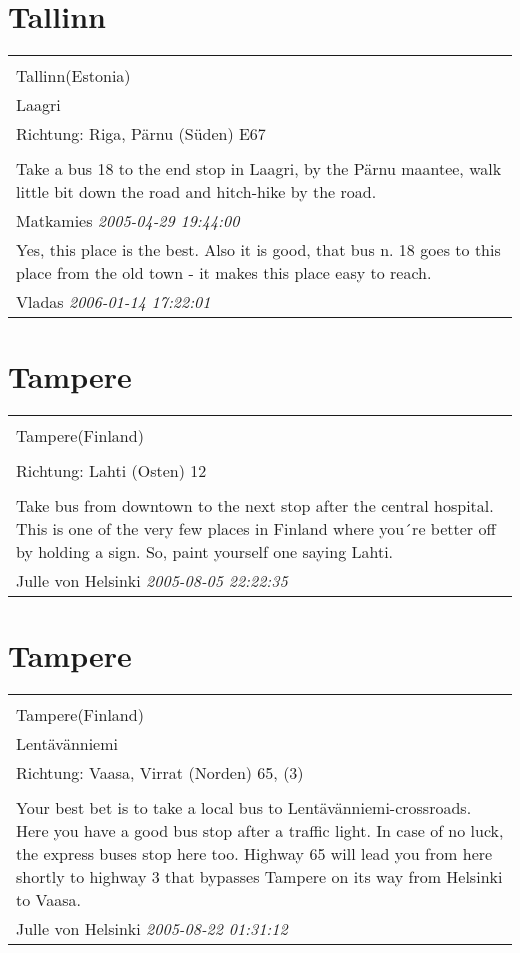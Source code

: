 \documentclass[a4paper,12pt]{article}
\begin{document}
\section{Tallinn}
\begin{tabular}{|p{13cm}|}
\hline\\
Tallinn(Estonia)\\
Laagri\\
Richtung: Riga, Pärnu (Süden) E67 \\
\hline\\
Take a bus 18 to the end stop in Laagri, by the Pärnu maantee, walk little bit down the road and hitch-hike by the road. \\
Matkamies \textit{ 2005-04-29 19:44:00 }\\\hline Yes, this place is the best. Also it is good, that bus n. 18 goes to this place from the old town - it makes this place easy to reach. \\
Vladas \textit{ 2006-01-14 17:22:01 }\\\hline
\end{tabular}


\section{Tampere}
\begin{tabular}{|p{13cm}|}
\hline\\
Tampere(Finland)\\
\\
Richtung: Lahti (Osten) 12 \\
\hline\\
Take bus from downtown to the next stop after the central hospital. This is one of the very few places in Finland where you´re better off by holding a sign. So, paint yourself one saying Lahti. \\
Julle von Helsinki \textit{ 2005-08-05 22:22:35 }\\\hline
\end{tabular}


\section{Tampere}
\begin{tabular}{|p{13cm}|}
\hline\\
Tampere(Finland)\\
Lentävänniemi\\
Richtung: Vaasa, Virrat (Norden) 65, (3) \\
\hline\\
Your best bet is to take a local bus to Lentävänniemi-crossroads. Here you have a good bus stop after a traffic light. In case of no luck, the express buses stop here too. Highway 65 will lead you from here shortly to highway 3 that bypasses Tampere on its way from Helsinki to Vaasa. \\
Julle von Helsinki \textit{ 2005-08-22 01:31:12 }\\\hline
\end{tabular}
\end{document}
